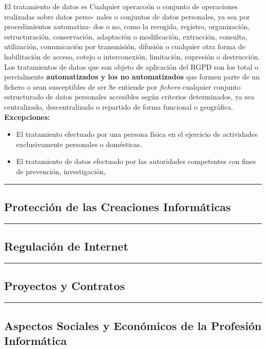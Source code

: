 \documentclass[spanish, 12pt, a4paper, twoside]{article}
\begin{document}
El tratamiento de datos es Cualquier operacoón o conjunto de operaciones realizadas sobre datos perso-
nales o conjuntos de datos personales, ya sea por procedimientos automatiza-
dos o no, como la recogida, registro, organización, estructuración, conservación,
adaptación o modificación, extracción, consulta, utilización, comunicación por
transmisión, difusión o cualquier otra forma de habilitación de acceso, cotejo o
interconexión, limitación, supresión o destrucción.\\

Los tratamientos de datos que son objeto de aplicación del RGPD son los total o percialmente
\textbf{automatizados y los no automatizados} que formen parte de un fichero o sean susceptibles de ser
Se entiende por \textit{fichero} cualquier conjunto estructurado de datos personales accesibles según 
criterios determinados, ya sea centralizado, descentralizado o repartido de forma funcional o geográfica.\\

\textbf{Excepciones:}
\begin{itemize}
    \item El tratamiento efectuado por una persona física en el ejercicio de actividades exclusivamente
    personales o domésticas.
    \item El tratamiento de datos efectuado por las autoridades competentes con fines de prevención, investigación,
\end{itemize}

\hfill \break
\newpage
\hrule
\subsection{Protección de las Creaciones Informáticas}

\newpage
\hrule
\subsection{Regulación de Internet}

\newpage
\hrule
\subsection{Proyectos y Contratos}

\newpage
\hrule
\subsection{Aspectos Sociales y Económicos de la Profesión Informática}
\end{document}
